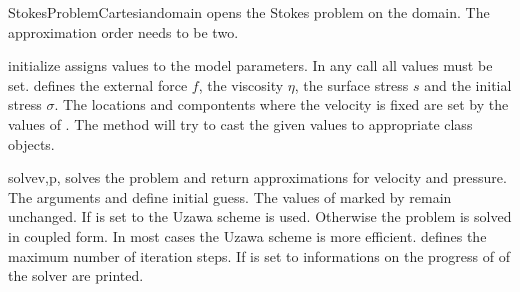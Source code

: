 \begin{classdesc}{StokesProblemCartesian}{domain}
opens the Stokes problem on the \Domain domain. The approximation
order needs to be two.
\end{classdesc}

\begin{methoddesc}[StokesProblemCartesian]{initialize}{}
assigns values to the model parameters. In any call all values must be set.
 defines the external force $f$,  the viscosity $\eta$,
 the surface stress $s$ and  the initial stress $\sigma$.
The locations and compontents where the velocity is fixed are set by 
the values of . The method will try to cast the given values to appropriate 
\Data class objects.
\end{methoddesc}

\begin{methoddesc}[StokesProblemCartesian]{solve}{v,p,
}
solves the problem and return approximations for velocity and pressure. 
The arguments  and  define initial guess. The values of  marked
by  remain unchanged. 
If  is set to \True 
the Uzawa scheme is used. Otherwise the problem is solved in coupled form. In most cases 
the Uzawa scheme is more efficient.
 defines the maximum number of iteration steps. 
If  is set to \True informations on the progress of of the solver are printed.
\end{methoddesc}


